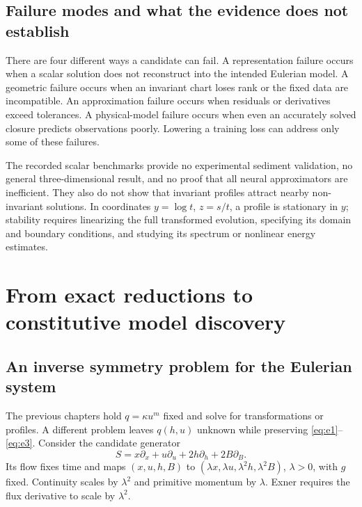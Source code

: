 \documentclass[11pt,a4paper,oneside]{report}
\numberwithin{equation}{chapter}
\begin{document}
\section{Failure modes and what the evidence does not establish}
There are four different ways a candidate can fail. A representation failure occurs when a scalar solution does not reconstruct into the intended Eulerian model. A geometric failure occurs when an invariant chart loses rank or the fixed data are incompatible. An approximation failure occurs when residuals or derivatives exceed tolerances. A physical-model failure occurs when even an accurately solved closure predicts observations poorly. Lowering a training loss can address only some of these failures.

The recorded scalar benchmarks provide no experimental sediment validation, no general three-dimensional result, and no proof that all neural approximators are inefficient. They also do not show that invariant profiles attract nearby non-invariant solutions. In coordinates $y=\log t$, $z=s/t$, a profile is stationary in $y$; stability requires linearizing the full transformed evolution, specifying its domain and boundary conditions, and studying its spectrum or nonlinear energy estimates.



\chapter{From exact reductions to constitutive model discovery}\label{ch:outlook}
\section{An inverse symmetry problem for the Eulerian system}
The previous chapters hold $q=\kappa u^m$ fixed and solve for transformations or profiles. A different problem leaves $q(h,u)$ unknown while preserving \eqref{eq:e1}--\eqref{eq:e3}. Consider the candidate generator
\begin{equation}\label{eq:euler-scale}
S=x\partial_x+u\partial_u+2h\partial_h+2B\partial_B.
\end{equation}
Its flow fixes time and maps $(x,u,h,B)$ to $(\lambda x,\lambda u,\lambda^2h,\lambda^2B)$, $\lambda>0$, with $g$ fixed. Continuity scales by $\lambda^2$ and primitive momentum by $\lambda$. Exner requires the flux derivative to scale by $\lambda^2$.
\end{document}
